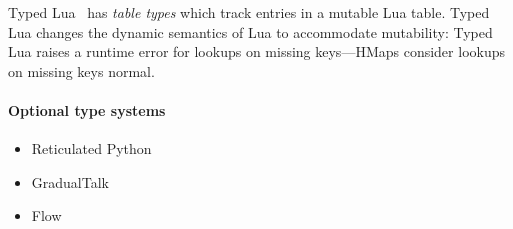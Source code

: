 Typed Lua~\cite{Maidl:2014:TLO} has \emph{table types} which track entries in a mutable Lua table.
Typed Lua changes the dynamic semantics of Lua to accommodate mutability: Typed Lua raises a runtime error
for lookups on missing keys---HMaps consider lookups on missing keys normal.


\paragraph{Optional type systems}
\begin{itemize}
  \item Reticulated Python~\cite{Vitousek14}
  \item GradualTalk
  \item Flow
\end{itemize}

